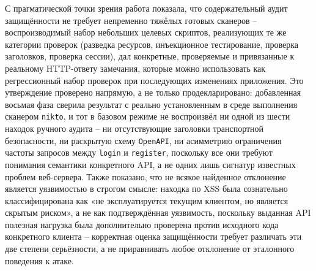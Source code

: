 С прагматической точки зрения работа показала, что содержательный
аудит защищённости не требует непременно тяжёлых готовых сканеров --
воспроизводимый набор небольших целевых скриптов, реализующих те же
категории проверок (разведка ресурсов, инъекционное тестирование,
проверка заголовков, проверка сессии), дал конкретные, проверяемые и
привязанные к реальному HTTP-ответу замечания, которые можно
использовать как регрессионный набор проверок при последующих
изменениях приложения. Это утверждение проверено напрямую, а не только
продекларировано: добавленная восьмая фаза сверила результат с реально
установленным в среде выполнения сканером \texttt{nikto}, и тот в
базовом режиме не воспроизвёл ни одной из шести находок ручного аудита
-- ни отсутствующие заголовки транспортной безопасности, ни раскрытую
схему \texttt{OpenAPI}, ни асимметрию ограничения частоты запросов между
\texttt{login} и \texttt{register}, поскольку все они требуют понимания
семантики конкретного API, а не одних лишь сигнатур известных проблем
веб-сервера. Также показано, что не всякое найденное
отклонение является уязвимостью в строгом смысле: находка по XSS была
сознательно классифицирована как «не эксплуатируется текущим клиентом,
но является скрытым риском», а не как подтверждённая уязвимость,
поскольку выданная API полезная нагрузка была дополнительно проверена
против исходного кода конкретного клиента -- корректная оценка
защищённости требует различать эти две степени серьёзности, а не
приравнивать любое отклонение от эталонного поведения к атаке.
